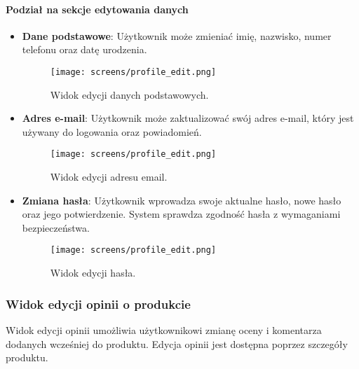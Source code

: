 \documentclass[12pt,a4paper,oneside]{article}
\theoremstyle{definition}
\numberwithin{equation}{section}
\begin{document}
\paragraph{Podział na sekcje edytowania danych}
\begin{itemize}
    \item \textbf{Dane podstawowe}: Użytkownik może zmieniać imię, nazwisko, numer telefonu oraz datę urodzenia.
    
\begin{figure}[H]
    \centering
    \texttt{[image: screens/profile\_edit.png]}
    \caption{Widok edycji danych podstawowych.}
    \label{fig:profile_edit_first}
\end{figure}

    \item \textbf{Adres e-mail}: Użytkownik może zaktualizować swój adres e-mail, który jest używany do logowania oraz powiadomień.
    
\begin{figure}[H]
    \centering
    \texttt{[image: screens/profile\_edit.png]}
    \caption{Widok edycji adresu email.}
    \label{fig:profile_edit_email}
\end{figure}
    
    \item \textbf{Zmiana hasła}: Użytkownik wprowadza swoje aktualne hasło, nowe hasło oraz jego potwierdzenie. System sprawdza zgodność hasła z wymaganiami bezpieczeństwa.

    \begin{figure}[H]
        \centering
        \texttt{[image: screens/profile\_edit.png]}
        \caption{Widok edycji hasła.}
        \label{fig:profile_password}
    \end{figure}
    
\end{itemize}





\subsubsection{Widok edycji opinii o produkcie}
Widok edycji opinii umożliwia użytkownikowi zmianę oceny i komentarza dodanych wcześniej do produktu. Edycja opinii jest dostępna poprzez szczegóły produktu.
\end{document}
